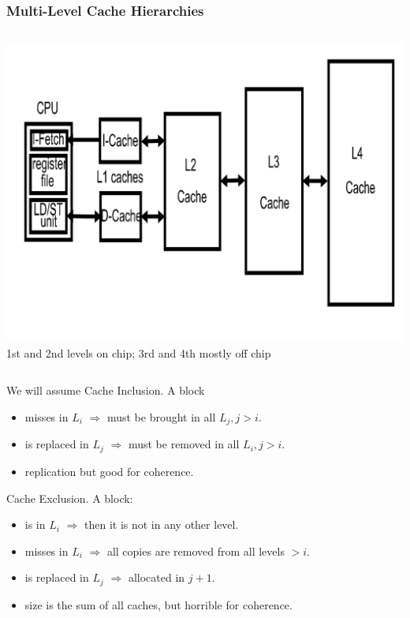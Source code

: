 \documentclass{beamer}
\renewcommand{\emph}[1]{\textcolor{structure}{#1}}
\newcommand{\emp}[1]{\textcolor{DikuRed}{ #1}}
\begin{document}
\begin{frame}[fragile,t]
\frametitle{Multi-Level Cache Hierarchies}

\begin{columns}
\includegraphics[width=35ex]{Figures/FigsMemH/MultiLevCache}
1st and 2nd levels on chip; 3rd and 4th mostly off chip\smallskip
\end{columns}

We will assume \emph{Cache Inclusion}. A block
\begin{scriptsize}
\begin{itemize}
    \item misses in $L_i$ $\Rightarrow$ must be brought in all $L_j, j>i$.
    \item is replaced in $L_j$ $\Rightarrow$ must be removed in all $L_i, j>i$.
    \item \emp{replication} but \emph{good for coherence}.
\end  {itemize}
\end  {scriptsize}\bigskip

\emp{Cache Exclusion.} A block:
\begin{scriptsize}
\begin{itemize}
    \item is in $L_i$ $\Rightarrow$ then it is not in any other level.
    \item misses in $L_i$ $\Rightarrow$ all copies are removed from all levels $> i$.
    \item is replaced in $L_j$ $\Rightarrow$ allocated in $j+1$.
    \item \emph{size is the sum of all caches}, but \emp{horrible for coherence}.
\end  {itemize}
\end  {scriptsize}\bigskip

\end{frame}
\end{document}
